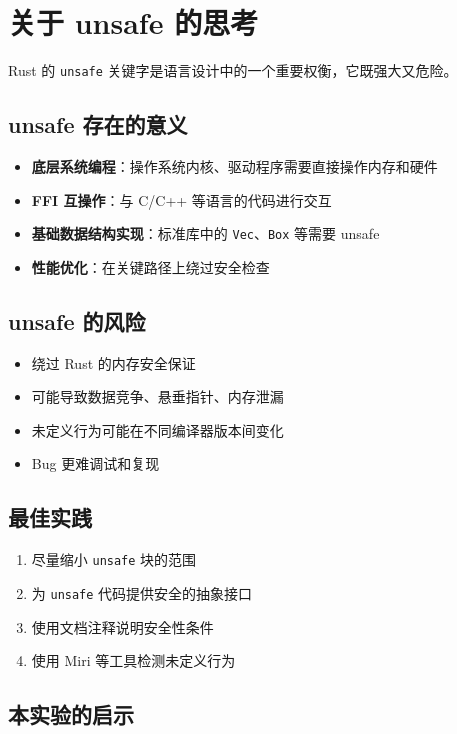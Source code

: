 \documentclass{SYSUReport}
\begin{document}
\section{关于 unsafe 的思考}

Rust 的 \texttt{unsafe} 关键字是语言设计中的一个重要权衡，它既强大又危险。

\subsection*{unsafe 存在的意义}

\begin{itemize}
    \item \textbf{底层系统编程}：操作系统内核、驱动程序需要直接操作内存和硬件
    \item \textbf{FFI 互操作}：与 C/C++ 等语言的代码进行交互
    \item \textbf{基础数据结构实现}：标准库中的 \texttt{Vec}、\texttt{Box} 等需要 unsafe
    \item \textbf{性能优化}：在关键路径上绕过安全检查
\end{itemize}

\subsection*{unsafe 的风险}

\begin{itemize}
    \item 绕过 Rust 的内存安全保证
    \item 可能导致数据竞争、悬垂指针、内存泄漏
    \item 未定义行为可能在不同编译器版本间变化
    \item Bug 更难调试和复现
\end{itemize}

\subsection*{最佳实践}

\begin{enumerate}
    \item 尽量缩小 \texttt{unsafe} 块的范围
    \item 为 \texttt{unsafe} 代码提供安全的抽象接口
    \item 使用文档注释说明安全性条件
    \item 使用 Miri 等工具检测未定义行为
\end{enumerate}

\subsection*{本实验的启示}
\end{document}
